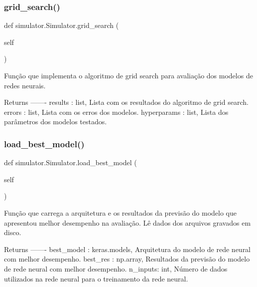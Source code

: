 \subsubsection{\texorpdfstring{grid\+\_\+search()}{grid\_search()}}
{\footnotesize\ttfamily def simulator.\+Simulator.\+grid\+\_\+search (\begin{DoxyParamCaption}\item[{}]{self }\end{DoxyParamCaption})}

\begin{DoxyVerb}Função que implementa o algoritmo de grid search para avaliação dos 
modelos de redes neurais.

Returns
-------
results : list,
    Lista com os resultados do algoritmo de grid search.
errors : list,
    Lista com os erros dos modelos.
hyperparams : list,
    Lista dos parâmetros dos modelos testados.\end{DoxyVerb}
 \mbox{\label{classsimulator_1_1Simulator_a9c33239232dc29a9a084fb57d5b8baa5}} 
\subsubsection{\texorpdfstring{load\+\_\+best\+\_\+model()}{load\_best\_model()}}
{\footnotesize\ttfamily def simulator.\+Simulator.\+load\+\_\+best\+\_\+model (\begin{DoxyParamCaption}\item[{}]{self }\end{DoxyParamCaption})}

\begin{DoxyVerb}Função que carrega a arquitetura e os resultados da previsão do modelo 
que apresentou melhor desempenho na avaliação. Lê dados dos arquivos
gravados em disco.

Returns
-------
best_model : keras.models, 
    Arquitetura do modelo de rede neural com melhor desempenho.
best_res : np.array,
    Resultados da previsão do modelo de rede neural com melhor desempenho.
n_inputs: int,
    Número de dados utilizados na rede neural para o treinamento da 
    rede neural.\end{DoxyVerb}
 \mbox{\label{classsimulator_1_1Simulator_a95328cad714d6390b8ef6eedb20b33c7}} 
